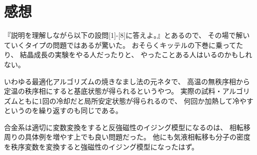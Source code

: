 \documentclass[../../master.tex]{subfiles}
\begin{document}
\section*{感想}
『説明を理解しながら以下の設問[1]-[8]に答えよ。』とあるので、
その場で解いていくタイプの問題ではあるが驚いた。
おそらくキッテルの下巻に乗ってたり、
結晶成長の実験をやる人だったりと、
やったことある人はいるのかもしれない。

いわゆる最適化アルゴリズムの焼きなまし法の元ネタで、
高温の無秩序相から定温の秩序相にすると基底状態が得られるというやつ。
実際の試料・アルゴリズムともに1回の冷却だと局所安定状態が得られるので、
何回か加熱して冷やすというのを繰り返すのも同じである。

合金系は適切に変数変換をすると反強磁性のイジング模型になるのは、
相転移周りの具体例を増やす上でも良い問題だった。
他にも気液相転移も分子の密度を秩序変数を変換すると強磁性のイジング模型になったはず。
\end{document}
